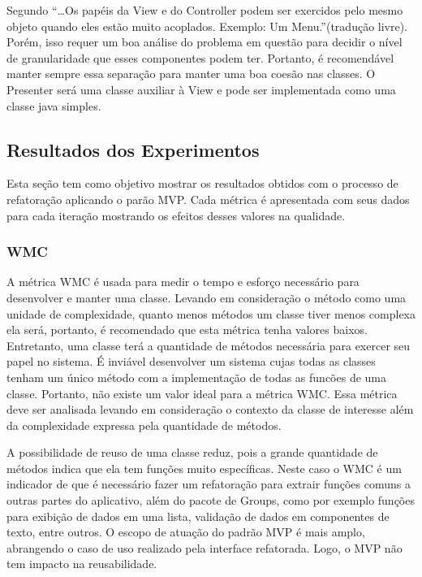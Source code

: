 \documentclass[conference]{IEEEtran}
\begin{document}
Segundo  ``\ldots Os papéis da View e do
Controller podem ser exercidos pelo mesmo objeto quando eles estão muito
acoplados. Exemplo: Um Menu.''(tradução livre). Porém, isso requer um boa
análise do problema em questão para decidir o nível de granularidade que esses componentes podem ter.
Portanto, é recomendável manter sempre essa separação para manter uma boa coesão
nas classes. O Presenter será uma classe auxiliar à View e pode ser implementada
como uma classe java simples. 



\subsection{Resultados dos Experimentos}

Esta seção tem como objetivo mostrar os resultados obtidos com o processo de
refatoração aplicando o parão MVP. Cada métrica é apresentada com seus dados
para cada iteração mostrando os efeitos desses valores na qualidade.

\subsubsection{WMC}

A métrica WMC é usada para medir o tempo e esforço necessário para desenvolver e
manter uma classe. Levando em consideração o método como uma unidade de
complexidade, quanto menos métodos um classe tiver menos complexa ela será,
portanto, é recomendado que esta métrica tenha valores baixos.
Entretanto, uma classe terá a quantidade de métodos necessária para exercer seu
papel no sistema. É inviável desenvolver um sistema cujas todas as classes
tenham um único método com a implementação de todas as funcões de uma
classe. Portanto, não existe um valor ideal para a métrica WMC. Essa métrica
deve ser analisada levando em consideração o contexto da classe de interesse além da
complexidade expressa pela quantidade de métodos. 

A possibilidade de reuso de uma classe reduz, pois a grande quantidade de
métodos indica que ela tem funções muito específicas\cite{cksuite}. Neste caso o
WMC é um indicador de que é necessário fazer um refatoração para extrair funções comuns a outras partes do
aplicativo, além do pacote de Groups, como por exemplo funções para exibição de
dados em uma lista, validação de dados em componentes de texto, entre outros. O
escopo de atuação do padrão MVP é mais amplo, abrangendo o caso de uso realizado pela
interface refatorada. Logo, o MVP não tem impacto na reusabilidade.
\end{document}
